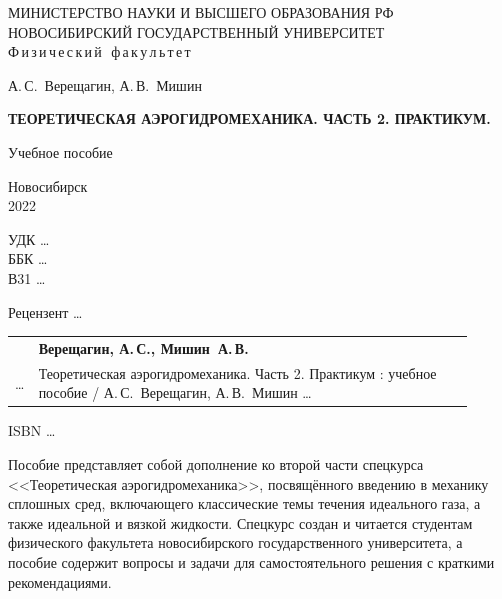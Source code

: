 \documentclass[a4paper, 14pt]{extarticle}
\begin{document}
\begin{titlepage}
	\pagestyle{empty}




	\centering	
	\footnotesize
	МИНИСТЕРСТВО НАУКИ И ВЫСШЕГО ОБРАЗОВАНИЯ РФ\\
	НОВОСИБИРСКИЙ ГОСУДАРСТВЕННЫЙ УНИВЕРСИТЕТ\\
	Ф\,и\,з\,и\,ч\,е\,с\,к\,и\,й\, \,ф\,а\,к\,у\,л\,ь\,т\,е\,т	
	
	
	\small
	\bigskip
	\bigskip
	\bigskip
	\bigskip
	
	А.\,С.~Верещагин, А.\,В.~Мишин
	\bigskip
	
	\textbf{ТЕОРЕТИЧЕСКАЯ АЭРОГИДРОМЕХАНИКА. ЧАСТЬ 2. ПРАКТИКУМ.}
	\bigskip
	
	Учебное пособие	
	
	\vfill	
	Новосибирск\\
	2022\\


\end{titlepage}


\footnotesize

\noindent УДК \ldots \\%
\noindent ББК \ldots \\%
\noindent В31 \ldots \\%


\begin{center}
	\centering
	Рецензент \ldots\\
\end{center}


\noindent
\begin{tabular}{p{0.01\linewidth}p{0.90\linewidth}}
	& 	\textbf{Верещагин, А.\,С., Мишин~А.\,В.}\\
	\ldots %
	& 
	Теоретическая аэрогидромеханика. Часть 2. Практикум : учебное пособие / А.\,С. Верещагин, А.\,В.~Мишин \ldots %
\end{tabular}

\medskip
ISBN  \ldots%

\medskip
Пособие представляет собой дополнение ко второй части спецкурса <<Теоретическая аэрогидромеханика>>, посвящённого введению в механику сплошных сред, включающего классические темы течения идеального газа, а также идеальной и вязкой жидкости. Спецкурс создан и читается   студентам физического факультета новосибирского государственного университета, а пособие содержит вопросы и задачи для самостоятельного решения с краткими рекомендациями.  
\end{document}
